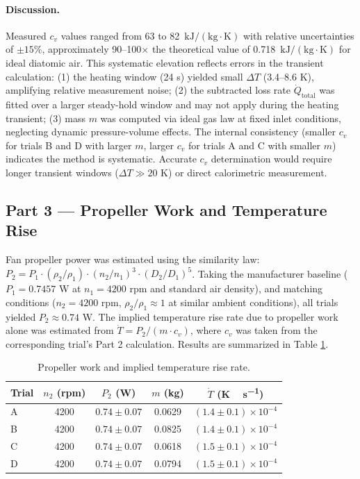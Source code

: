 \documentclass[12pt]{article}
\begin{document}
\paragraph{Discussion.} Measured $c_v$ values ranged from 63 to 82~$\mathrm{kJ/(kg \cdot K)}$ with relative uncertainties of $\pm 15\%$, approximately 90--100$\times$ the theoretical value of 0.718~$\mathrm{kJ/(kg \cdot K)}$ for ideal diatomic air. This systematic elevation reflects errors in the transient calculation: (1) the heating window (24 s) yielded small $\Delta T$ (3.4--8.6 K), amplifying relative measurement noise; (2) the subtracted loss rate $\dot{Q}_{\text{total}}$ was fitted over a larger steady-hold window and may not apply during the heating transient; (3) mass $m$ was computed via ideal gas law at fixed inlet conditions, neglecting dynamic pressure-volume effects. The internal consistency (smaller $c_v$ for trials B and D with larger $m$, larger $c_v$ for trials A and C with smaller $m$) indicates the method is systematic. Accurate $c_v$ determination would require longer transient windows ($\Delta T \gg 20$ K) or direct calorimetric measurement.

\subsection*{Part 3 — Propeller Work and Temperature Rise}

Fan propeller power was estimated using the similarity law: $P_2 = P_1 \cdot (\rho_2/\rho_1) \cdot (n_2/n_1)^3 \cdot (D_2/D_1)^5$. Taking the manufacturer baseline ($P_1 = 0.7457$ W at $n_1 = 4200$ rpm and standard air density), and matching conditions ($n_2 = 4200$ rpm, $\rho_2/\rho_1 \approx 1$ at similar ambient conditions), all trials yielded $P_2 \approx 0.74$ W. The implied temperature rise rate due to propeller work alone was estimated from $\dot{T} = P_2 / (m \cdot c_v)$, where $c_v$ was taken from the corresponding trial's Part 2 calculation. Results are summarized in Table \ref{tab:prop}.

\begin{table}[H]\centering
\caption{Propeller work and implied temperature rise rate.}
\label{tab:prop}
\begin{tabular}{@{}lcccc@{}}
\toprule
Trial & $n_2$ (rpm) & $P_2$ (W) & $m$ (kg) & $\dot T$ (\si{K\,s^{-1}}) \\
\midrule
A & 4200 & $0.74 \pm 0.07$ & 0.0629 & $(1.4 \pm 0.1) \times 10^{-4}$ \\
B & 4200 & $0.74 \pm 0.07$ & 0.0825 & $(1.4 \pm 0.1) \times 10^{-4}$ \\
C & 4200 & $0.74 \pm 0.07$ & 0.0618 & $(1.5 \pm 0.1) \times 10^{-4}$ \\
D & 4200 & $0.74 \pm 0.07$ & 0.0794 & $(1.5 \pm 0.1) \times 10^{-4}$ \\
\bottomrule
\end{tabular}
\end{table}
\end{document}
